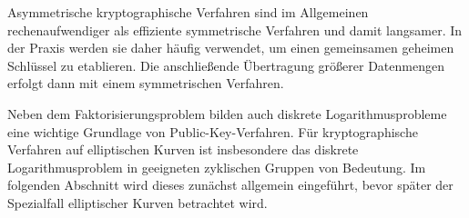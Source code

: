 \begin{bemerkung}
    Asymmetrische kryptographische Verfahren sind im Allgemeinen rechenaufwendiger als effiziente symmetrische Verfahren und damit langsamer. In der Praxis werden sie daher häufig verwendet, um einen gemeinsamen geheimen Schlüssel zu etablieren. Die anschließende Übertragung größerer Datenmengen erfolgt dann mit einem symmetrischen Verfahren.
\end{bemerkung}

Neben dem Faktorisierungsproblem bilden auch diskrete Logarithmusprobleme eine wichtige Grundlage von Public-Key-Verfahren. Für kryptographische Verfahren auf elliptischen Kurven ist insbesondere das diskrete Logarithmusproblem in geeigneten zyklischen Gruppen von Bedeutung. Im folgenden Abschnitt wird dieses zunächst allgemein eingeführt,
bevor später der Spezialfall elliptischer Kurven betrachtet wird.

